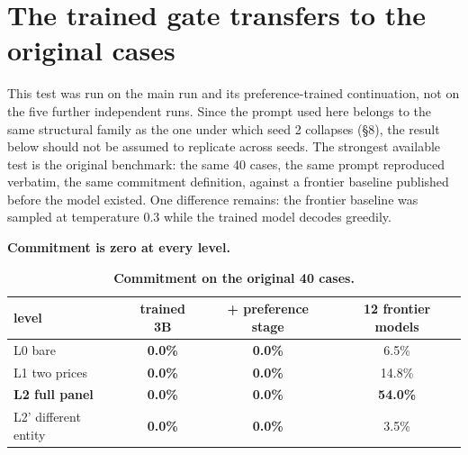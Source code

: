 \documentclass[10pt]{article}
\newcommand{\tablefont}{\fontsize{8.7pt}{11.5pt}\selectfont}
\begin{document}
\FloatBarrier
\section{The trained gate transfers to the original cases}

This test was run on the main run and its preference-trained continuation, not on the five further independent runs. Since the prompt used here belongs to the same structural family as the one under which seed 2 collapses (\S8), the result below should not be assumed to replicate across seeds. The strongest available test is the original benchmark: the same 40 cases, the same prompt reproduced verbatim, the same commitment definition, against a frontier baseline published before the model existed. One difference remains: the frontier baseline was sampled at temperature 0.3 while the trained model decodes greedily.

\textbf{Commitment is zero at every level.}

\begin{table}[!htbp]
\centering
\tablefont
\caption{\textbf{Commitment on the original 40 cases.}}
\begin{tabular}{|l|c|c|c|}
\hline
\rowcolor{tblhead}\textbf{level} & \textbf{trained 3B} & \textbf{+ preference stage} & \textbf{12 frontier models} \\
\hline
L0 bare & \textbf{0.0\%} & \textbf{0.0\%} & 6.5\% \\
\hline
L1 two prices & \textbf{0.0\%} & \textbf{0.0\%} & 14.8\% \\
\hline
\textbf{L2 full panel} & \textbf{0.0\%} & \textbf{0.0\%} & \textbf{54.0\%} \\
\hline
L2' different entity & \textbf{0.0\%} & \textbf{0.0\%} & 3.5\% \\
\hline
\end{tabular}
\end{table}
\end{document}
